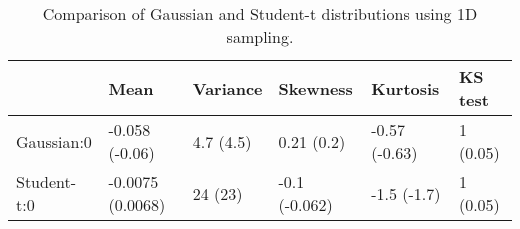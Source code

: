 \begin{table}
\centering
\caption{Comparison of Gaussian and Student-t distributions using 1D sampling.}
\label{tab:ch5_6_a}
\begin{tabular}{llllll}
\toprule
{} &              Mean &   Variance &       Skewness &       Kurtosis &   KS test \\
\midrule
Gaussian:0  &    -0.058 (-0.06) &  4.7 (4.5) &     0.21 (0.2) &  -0.57 (-0.63) &  1 (0.05) \\
Student-t:0 &  -0.0075 (0.0068) &    24 (23) &  -0.1 (-0.062) &    -1.5 (-1.7) &  1 (0.05) \\
\bottomrule
\end{tabular}
\end{table}
